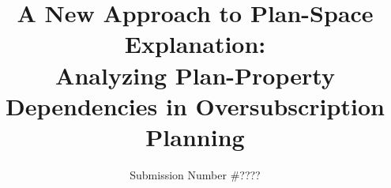 \documentclass[letterpaper]{article} %
\begin{document}
\title{A New Approach to Plan-Space Explanation:\\ Analyzing Plan-Property Dependencies in Oversubscription Planning}

\author{Submission Number \#????}

%

\maketitle
\end{document}
